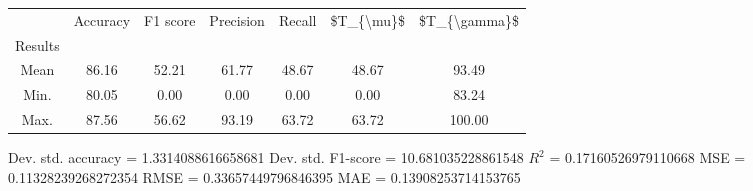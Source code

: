 \begin{tabular}{|c|c|c|c|c|c|c|}
\toprule
{} &  Accuracy &  F1 score &  Precision &  Recall &  \$T\_\{\textbackslash mu\}\$ &  \$T\_\{\textbackslash gamma\}\$ \\
Results &           &           &            &         &            &               \\
\hline
Mean    &     86.16 &     52.21 &      61.77 &   48.67 &      48.67 &         93.49 \\
Min.    &     80.05 &      0.00 &       0.00 &    0.00 &       0.00 &         83.24 \\
Max.    &     87.56 &     56.62 &      93.19 &   63.72 &      63.72 &        100.00 \\
\bottomrule
\end{tabular}

 Dev. std. accuracy = 1.3314088616658681
 Dev. std. F1-score = 10.681035228861548
 $R^2$ = 0.17160526979110668
 MSE = 0.11328239268272354
 RMSE = 0.33657449796846395
 MAE = 0.13908253714153765